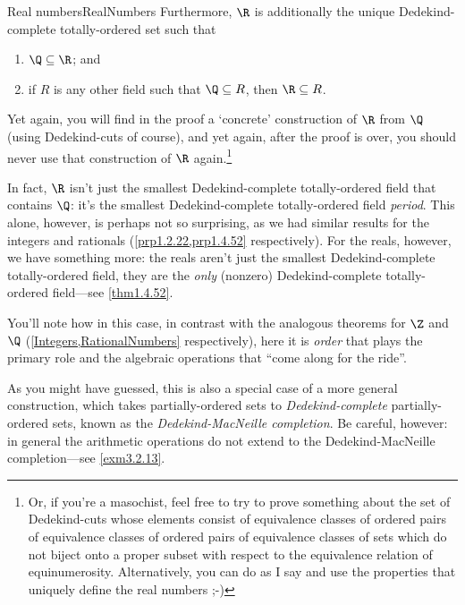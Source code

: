\begin{thm}{Real numbers}{RealNumbers}
Furthermore, $\R$ is additionally the unique Dedekind-complete totally-ordered set such that
\begin{enumerate}
\item \label{RealNumbers.iprime}$\Q \subseteq \R$; and
\item \label{RealNumbers.iiprime}if $R$ is any other field such that $\Q \subseteq R$, then $\R \subseteq R$.
\end{enumerate}
\begin{rmk}
Yet again, you will find in the proof a `concrete' construction of $\R$ from $\Q$ (using Dedekind-cuts of course), and yet again, after the proof is over, you should never use that construction of $\R$ again.\footnote{Or, if you're a masochist, feel free to try to prove something about the set of Dedekind-cuts whose elements consist of equivalence classes of ordered pairs of equivalence classes of ordered pairs of equivalence classes of sets which do not biject onto a proper subset with respect to the equivalence relation of equinumerosity.  Alternatively, you can do as I say and use the properties that uniquely define the real numbers ;-)}
\end{rmk}
\begin{rmk}
In fact, $\R$ isn't just the smallest Dedekind-complete totally-ordered field that contains $\Q$:  it's the smallest Dedekind-complete totally-ordered field \emph{period}.  This alone, however, is perhaps not so surprising, as we had similar results for the integers and rationals (\cref{prp1.2.22,prp1.4.52} respectively).  For the reals, however, we have something more:  the reals aren't just the smallest Dedekind-complete totally-ordered field, they are the \emph{only} (nonzero) Dedekind-complete totally-ordered field---see \cref{thm1.4.52}.
\end{rmk}
\begin{rmk}
You'll note how in this case, in contrast with the analogous theorems for $\Z$ and $\Q$ (\cref{Integers,RationalNumbers} respectively), here it is \emph{order} that plays the primary role and the algebraic operations that ``come along for the ride''.
\end{rmk}
\begin{rmk}
As you might have guessed, this is also a special case of a more general construction, which takes partially-ordered sets to \emph{Dedekind-complete} partially-ordered sets, known as the \emph{Dedekind-MacNeille completion}.  Be careful, however:  in general the arithmetic operations do not extend to the Dedekind-MacNeille completion---see \cref{exm3.2.13}.

\end{rmk}
\end{thm}
